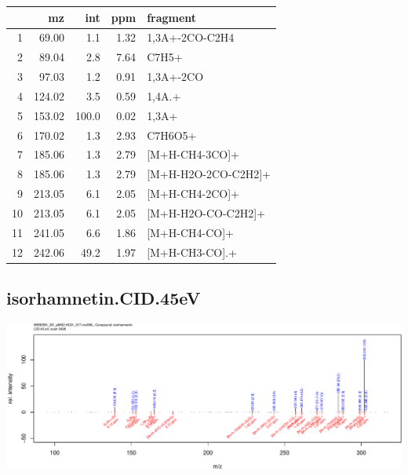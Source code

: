 \documentclass[]{article}
\begin{document}
\begin{table}[ht]
\centering
\begin{tabular}{rrrrl}
  \toprule
 & mz & int & ppm & fragment \\ 
  \midrule
1 & 69.00 & 1.1 & 1.32 & 1,3A+-2CO-C2H4 \\ 
  2 & 89.04 & 2.8 & 7.64 & C7H5+ \\ 
  3 & 97.03 & 1.2 & 0.91 & 1,3A+-2CO \\ 
  4 & 124.02 & 3.5 & 0.59 & 1,4A.+ \\ 
  5 & 153.02 & 100.0 & 0.02 & 1,3A+ \\ 
  6 & 170.02 & 1.3 & 2.93 & C7H6O5+ \\ 
  7 & 185.06 & 1.3 & 2.79 & [M+H-CH4-3CO]+ \\ 
  8 & 185.06 & 1.3 & 2.79 & [M+H-H2O-2CO-C2H2]+ \\ 
  9 & 213.05 & 6.1 & 2.05 & [M+H-CH4-2CO]+ \\ 
  10 & 213.05 & 6.1 & 2.05 & [M+H-H2O-CO-C2H2]+ \\ 
  11 & 241.05 & 6.6 & 1.86 & [M+H-CH4-CO]+ \\ 
  12 & 242.06 & 49.2 & 1.97 & [M+H-CH3-CO].+ \\ 
   \bottomrule
\end{tabular}
\end{table}

\clearpage\subsection{isorhamnetin.CID.45eV}
\includegraphics[width=\textwidth]{WEB350_files/figure-latex/unnamed-chunk-3-40}
\end{document}
